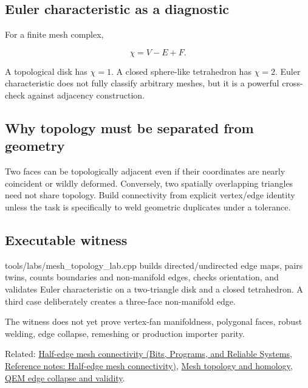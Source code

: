 \subsection{Euler characteristic as a diagnostic}\label{appendix-faac749c9cdd-euler-characteristic-as-a-diagnostic}

For a finite mesh complex,

\[
\chi = V-E+F.
\]

A topological disk has \(\chi=1\). A closed sphere-like tetrahedron has \(\chi=2\). Euler characteristic does not fully classify arbitrary meshes, but it is a powerful cross-check against adjacency construction.

\subsection{Why topology must be separated from geometry}\label{appendix-faac749c9cdd-why-topology-must-be-separated-from-geometry}

Two faces can be topologically adjacent even if their coordinates are nearly coincident or wildly deformed. Conversely, two spatially overlapping triangles need not share topology. Build connectivity from explicit vertex/edge identity unless the task is specifically to weld geometric duplicates under a tolerance.

\subsection{Executable witness}\label{appendix-faac749c9cdd-executable-witness}

tools/labs/mesh\_topology\_lab.cpp builds directed/undirected edge maps, pairs twins, counts boundaries and non-manifold edges, checks orientation, and validates Euler characteristic on a two-triangle disk and a closed tetrahedron. A third case deliberately creates a three-face non-manifold edge.

The witness does not yet prove vertex-fan manifoldness, polygonal faces, robust welding, edge collapse, remeshing or production importer parity.

Related: \href{../01-Bits-Programs-and-Reliable-Systems/main.pdf\#nameddest=appendix-1aea26b2307f}{Half-edge mesh connectivity (Bits, Programs, and Reliable Systems, Reference notes: Half-edge mesh connectivity)}, \hyperref[appendix-e38976cbbf86]{Mesh topology and homology}, \hyperref[appendix-89db9fe1bc8a]{QEM edge collapse and validity}.
